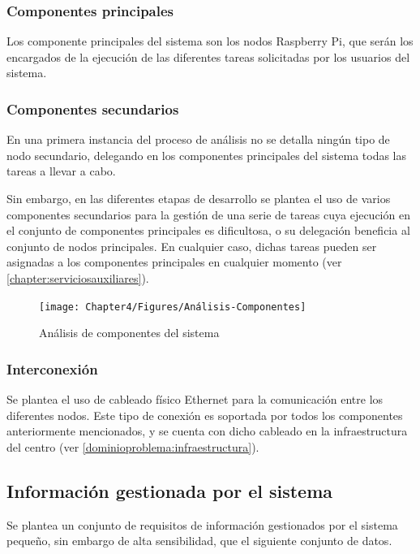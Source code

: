 \subsubsection{Componentes principales} 

Los componente principales del sistema son los nodos Raspberry Pi, que serán los encargados de la ejecución de las diferentes tareas solicitadas por los usuarios del sistema.

\subsubsection{Componentes secundarios}

En una primera instancia del proceso de análisis no se detalla ningún tipo de nodo secundario, delegando en los componentes principales del sistema todas las tareas a llevar a cabo.

Sin embargo, en las diferentes etapas de desarrollo se plantea el uso de varios componentes secundarios para la gestión de una serie de tareas cuya ejecución en el conjunto de componentes principales es dificultosa, o su delegación beneficia al conjunto de nodos principales. En cualquier caso, dichas tareas pueden ser asignadas a los componentes principales en cualquier momento (ver \ref{chapter:serviciosauxiliares}).

\begin{figure}[H]
  \centering
  \texttt{[image: Chapter4/Figures/Análisis-Componentes]}
  \caption[Análisis de componentes]{Análisis de componentes del sistema}
  \label{analisis:componentes}
\end{figure}

\subsubsection{Interconexión}

Se plantea el uso de cableado físico Ethernet para la comunicación entre los diferentes nodos. Este tipo de conexión es soportada por todos los componentes anteriormente mencionados, y se cuenta con dicho cableado en la infraestructura del centro (ver \ref{dominioproblema:infraestructura}).

\subsection{Información gestionada por el sistema}

Se plantea un conjunto de requisitos de información gestionados por el sistema pequeño, sin embargo de alta sensibilidad, que el siguiente conjunto de datos.


